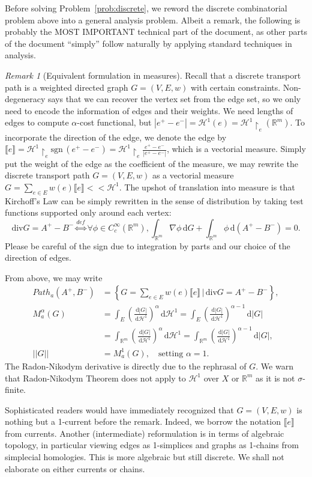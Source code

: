 \documentclass[fleqn]{article}
\theoremstyle{definition}
\theoremstyle{remark}
\newtheorem{rem}[thm]{Remark}
\renewcommand{\d}{\,\mathrm{d}} %
\renewcommand{\H}{\mathcal{H}^1} %
\newcommand{\sgn}{\mathrm{sgn}\,} %
\begin{document}
Before solving Problem~\ref{prob:discrete}, we reword the discrete combinatorial problem above into a general analysis problem. Albeit a remark, the following is probably the MOST IMPORTANT technical part of the document, as other parts of the document ``simply'' follow naturally by applying standard techniques in analysis.
\begin{rem}[Equivalent formulation in measures]\label{rem:eqv}
Recall that a discrete transport path is a weighted directed graph $G=(V,E,w)$ with certain constraints. Non-degeneracy says that we can recover the vertex set from the edge set, so we only need to encode the information of edges and their weights. We need lengths of edges to compute $\alpha$-cost functional, but $|e^+ -e^-|=\H(e)=\H\upharpoonright_e(\mathbb{R}^m)$. To incorporate the direction of the edge, we denote the edge by $\llbracket e\rrbracket=\H\upharpoonright_e \sgn(e^+ -e^-)=\H\upharpoonright_e \frac{e^+ -e^-}{|e^+ -e^-|}$, which is a vectorial measure. Simply put the weight of the edge as the coefficient of the measure, we may rewrite the discrete transport path $G=(V,E,w)$ as a vectorial measure $G=\sum_{e\in E}w(e)\llbracket e\rrbracket << \H$. The upshot of translation into measure is that Kirchoff's Law can be simply rewritten in the sense of distribution by taking test functions supported only around each vertex:
$$\mathrm{div } G = A^+ - B^- \stackrel{def}{\iff} \forall \phi\in C^\infty_c(\mathbb{R}^m), \int_{\mathbb{R}^m} \nabla\phi\d G + \int_{\mathbb{R}^m} \phi\d(A^+ - B^-) = 0.$$
Please be careful of the sign due to integration by parts and our choice of the direction of edges.
\par
From above, we may write
\begin{align*}
Path_a(A^+, B^-) &= \left\{G=\sum_{e\in E} w(e)\llbracket e\rrbracket \,\Bigg|\, \mathrm{div }G = A^+ - B^-\right\}, \\
M_a^\alpha(G) &= \int_E \left(\frac{\d|G|}{\d\H}\right)^{\alpha} \d\H  = \int_E \left(\frac{\d|G|}{\d\H}\right)^{\alpha-1} \d|G| \\
&= \int_{\mathbb{R}^m} \left(\frac{\d|G|}{\d\H}\right)^{\alpha} \d\H = \int_{\mathbb{R}^m} \left(\frac{\d|G|}{\d\H}\right)^{\alpha-1} \d|G|, \\
||G|| &= M_a^1(G), \quad \textrm{setting }\alpha=1.
\end{align*}
The Radon-Nikodym derivative is directly due to the rephrasal of $G$. We warn that Radon-Nikodym Theorem does not apply to $\H$ over $X$ or $\mathbb{R}^m$ as it is not $\sigma$-finite.
\par
Sophisticated readers would have immediately recognized that $G=(V,E,w)$ is nothing but a 1-current before the remark. Indeed, we borrow the notation $\llbracket e\rrbracket$ from currents. Another (intermediate) reformulation is in terms of algebraic topology, in particular viewing edges as 1-simplices and graphs as 1-chains from simplecial homologies. This is more algebraic but still discrete. We shall not elaborate on either currents or chains.
\end{rem}
\end{document}
